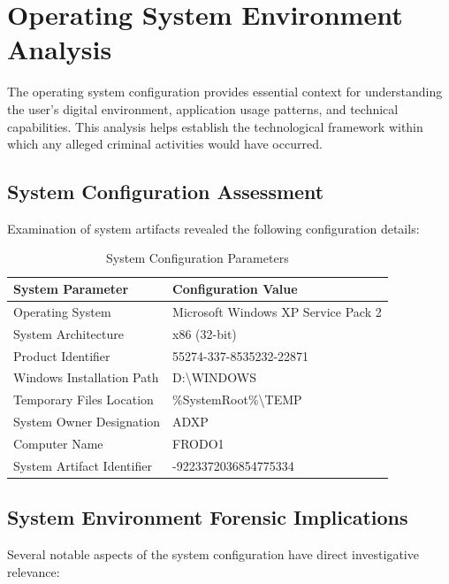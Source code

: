 \section{Operating System Environment Analysis}
The operating system configuration provides essential context for understanding the user's digital environment, application usage patterns, and technical capabilities. This analysis helps establish the technological framework within which any alleged criminal activities would have occurred.

\subsection{System Configuration Assessment}
Examination of system artifacts revealed the following configuration details:

\begin{table}[htbp]
\centering
\begin{tabular}{|p{5cm}|p{8.5cm}|}
\hline
\textbf{System Parameter} & \textbf{Configuration Value} \\
\hline
Operating System & Microsoft Windows XP Service Pack 2 \\
\hline
System Architecture & x86 (32-bit) \\
\hline
Product Identifier & 55274-337-8535232-22871 \\
\hline
Windows Installation Path & D:\textbackslash{}WINDOWS \\
\hline
Temporary Files Location & \%SystemRoot\%\textbackslash{}TEMP \\
\hline
System Owner Designation & ADXP \\
\hline
Computer Name & FRODO1 \\
\hline
System Artifact Identifier & -9223372036854775334 \\
\hline
\end{tabular}
\caption{System Configuration Parameters}
\label{table:system_config}
\end{table}

\subsection{System Environment Forensic Implications}
Several notable aspects of the system configuration have direct investigative relevance:

